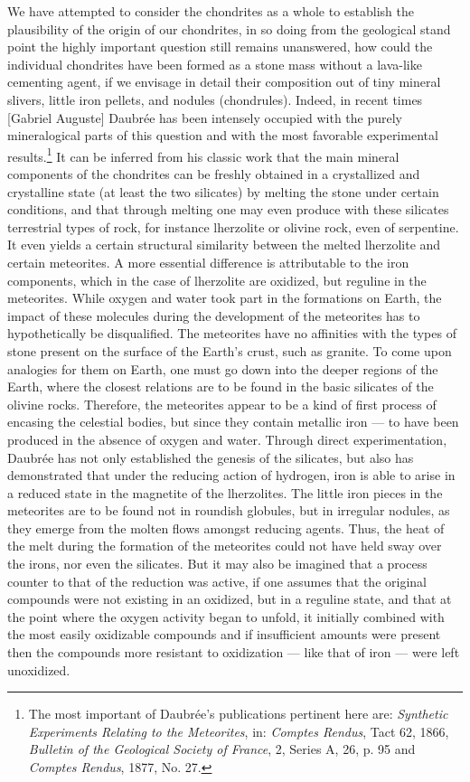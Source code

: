 \documentclass[a4paper, 12pt, oneside]{article}
\begin{document}
We have attempted to consider the chondrites as a whole to establish the plausibility of the origin of our chondrites, in so doing from the geological stand point the highly important question still remains unanswered, how could the individual chondrites have been formed as a stone mass without a lava-like cementing agent, if we envisage in detail their composition out of tiny mineral slivers, little iron pellets, and nodules (chondrules). Indeed, in recent times [Gabriel Auguste] Daubrée has been intensely occupied with the purely mineralogical parts of this question and with the most favorable experimental results.\footnote{The most important of Daubrée's publications pertinent here are: \emph{Synthetic Experiments Relating to the Meteorites}, in: \emph{Comptes Rendus}, Tact 62, 1866, \emph{Bulletin of the Geological Society of France}, 2, Series A, 26, p. 95 and \emph{Comptes Rendus}, 1877, No. 27.} It can be inferred from his classic work that the main mineral components of the chondrites can be freshly obtained in a crystallized and crystalline state (at least the two silicates) by melting the stone under certain conditions, and that through melting one may even produce with these silicates terrestrial types of rock, for instance lherzolite or olivine rock, even of serpentine. It even yields a certain structural similarity between the melted lherzolite and certain meteorites. A more essential difference is attributable to the iron components, which in the case of lherzolite are oxidized, but reguline in the meteorites. While oxygen and water took part in the formations on Earth, the impact of these molecules during the development of the meteorites has to hypothetically be disqualified. The meteorites have no affinities with the types of stone present on the surface of the Earth's crust, such as granite. To come upon analogies for them on Earth, one must go down into the deeper regions of the Earth, where the closest relations are to be found in the basic silicates of the olivine rocks. Therefore, the meteorites appear to be a kind of first process of encasing the celestial bodies, but since they contain metallic iron --- to have been produced in the absence of oxygen and water. Through direct experimentation, Daubrée has not only established the genesis of the silicates, but also has demonstrated that under the reducing action of hydrogen, iron is able to arise in a reduced state in the magnetite of the lherzolites. The little iron pieces in the meteorites are to be found not in roundish globules, but in irregular nodules, as they emerge from the molten flows amongst reducing agents. Thus, the heat of the melt during the formation of the meteorites could not have held sway over the irons, nor even the silicates. But it may also be imagined that a process counter to that of the reduction was active, if one assumes that the original compounds were not existing in an oxidized, but in a reguline state, and that at the point where the oxygen activity began to unfold, it initially combined with the most easily oxidizable compounds and if insufficient amounts were present then the compounds more resistant to oxidization --- like that of iron --- were left unoxidized.
\end{document}
